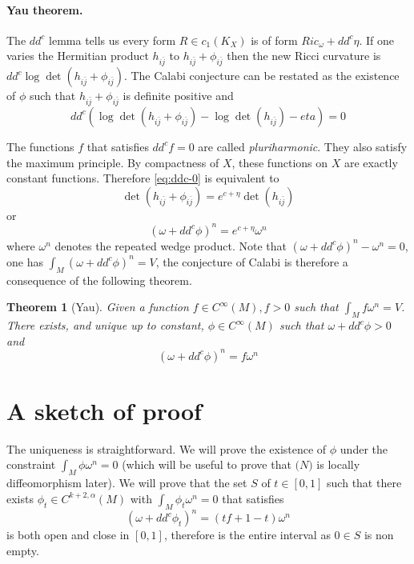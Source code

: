 \documentclass[11pt]{article}
\newtheorem{theorem}{Theorem}
\begin{document}
\paragraph*{Yau theorem.}
\label{sec:orge8dfb15}
The \(dd^c\) lemma tells us every form \(R\in c_1(K_X)\) is of form \(Ric_{\omega} + dd^c\eta\). If one
varies the Hermitian product \(h_{i\bar j}\) to \(h_{i\bar j} + \phi_{i\bar j}\) then the new Ricci
curvature is \(dd^c\log\det(h_{i\bar j} + \phi_{i\bar j})\). The Calabi conjecture can be restated as
the existence of \(\phi\) such that \(h_{i\bar j} + \phi_{i\bar j}\) is definite positive and
\begin{equation}
\label{eq:ddc-0}
dd^c\left( \log\det(h_{i\bar j} + \phi_{i\bar j}) - \log\det(h_{i\bar j}) -eta\right) = 0
\end{equation}

The functions \(f\) that satisfies \(dd^cf = 0\) are called \emph{pluriharmonic}. They also satisfy the
maximum principle. By compactness of \(X\), these functions on \(X\) are exactly constant
functions. Therefore \ref{eq:ddc-0} is equivalent to
\[
\det(h_{i\bar j} + \phi_{i\bar j}) = e^{c+\eta}\det(h_{i \bar j})
\]
or
\[
(\omega + dd^c\phi)^n = e^{c+\eta}\omega^n
\]
where \(\omega^n\) denotes the repeated wedge product. Note that \((\omega +dd^c\phi)^n - \omega^n = 0\),
one has \(\int_M (\omega +dd^c\phi)^n = V\), the conjecture of Calabi is therefore a consequence of
the following theorem.

\begin{theorem}[Yau]
Given a function \(f\in C^\infty(M), f>0\) such that \(\int_M f\omega^n = V\). There exists, and unique
up to constant, \(\phi\in C^\infty(M)\) such that \(\omega + dd^c\phi >0\) and
\[
(\omega + dd^c\phi)^n = f\omega^n
\]
\end{theorem}

\section{A sketch of proof}
\label{sec:org51437b6}
The uniqueness is straightforward. We will prove the existence of \(\phi\) under the constraint
\(\int_M\phi\omega^n = 0\) (which will be useful to prove that \(\mathcal(N)\) is locally diffeomorphism
later). We will prove that the set \(S\) of \(t\in [0,1]\) such that there exists \(\phi_t\in
C^{k+2,\alpha}(M)\) with \(\int_M \phi_t\omega^n = 0\) that satisfies
\begin{equation}
\label{eq:omega-convex-t}
(\omega + dd^c\phi_t)^n = (tf + 1-t)\omega^n
\end{equation}
is both open and close in \([0,1]\), therefore is the entire interval as \(0\in S\) is non empty.
\end{document}
